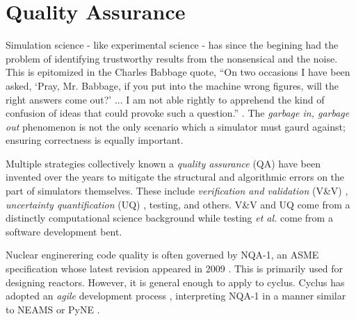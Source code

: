 \section{Quality Assurance}
%

%


Simulation science - like experimental science - has since the begining had the 
problem of identifying trustworthy results from the nonsensical and the noise.
This is epitomized in the Charles Babbage quote, ``On two occasions I have been asked, 
`Pray, Mr. Babbage, if you put into the machine wrong figures, will the right 
answers come out?' ... I am not able rightly to apprehend the kind of confusion 
of ideas that could provoke such a question.'' \cite{babbage_passages_2011}. 
The \emph{garbage in, garbage out} phenomenon is not the only scenario which a
simulator must gaurd against; ensuring correctness is equally important.

Multiple strategies collectively known a \emph{quality assurance} (QA) have 
been invented over the years to mitigate the structural and algorithmic errors
on the part of simulators themselves. These include \emph{verification and validation}
(V\&V) \cite{boehm_software_1989}, \emph{uncertainty quantification} (UQ) 
\cite{sacks_design_1989}, testing, and others. V\&V and UQ come from 
a distinctly computational science background while testing \emph{et al.} come from 
a software development bent. 

Nuclear enginerering code quality is often governed by NQA-1, an ASME specification 
whose latest revision appeared in 2009 \cite{asme_nqa-1a-2009_2009}. This is primarily 
used for designing reactors. However, it is general enough to apply to 
cyclus. Cyclus has adopted an \emph{agile} development process 
\cite{larman_agile_2004}, 
interpreting NQA-1 in a manner similar to NEAMS \cite{neams_nuclear_2013} or 
PyNE \cite{biondo_quality_2014}. 

